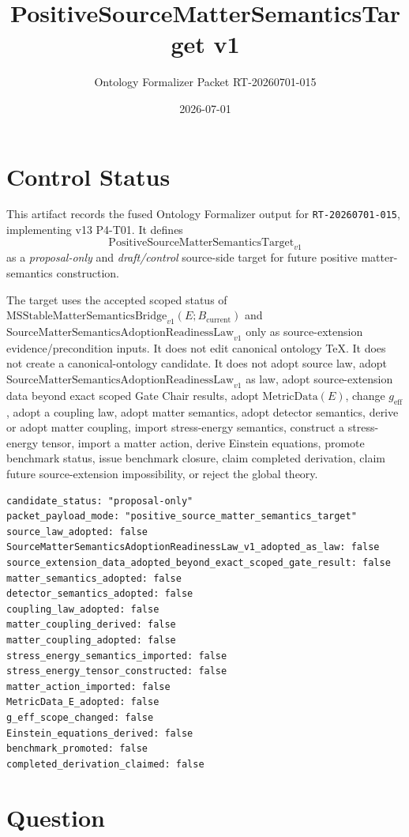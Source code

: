 \documentclass[11pt]{article}
\title{PositiveSourceMatterSemanticsTarget v1}
\author{Ontology Formalizer Packet RT-20260701-015}
\date{2026-07-01}
\newcommand{\Bcur}{B_{\mathrm{current}}}
\newcommand{\MSBridge}{\mathrm{MSStableMatterSemanticsBridge}_{v1}}
\newcommand{\SMSAR}{\mathrm{SourceMatterSemanticsAdoptionReadinessLaw}_{v1}}
\newcommand{\PMSTarget}{\mathrm{PositiveSourceMatterSemanticsTarget}_{v1}}
\newcommand{\MetricData}{\mathrm{MetricData}}
\newcommand{\geff}{g_{\mathrm{eff}}}
\begin{document}
\maketitle

\section{Control Status}

This artifact records the fused Ontology Formalizer output for
\texttt{RT-20260701-015}, implementing v13 P4-T01. It defines
\[
  \PMSTarget
\]
as a \emph{proposal-only} and \emph{draft/control} source-side target for
future positive matter-semantics construction.

The target uses the accepted scoped status of \(\MSBridge(E;\Bcur)\) and
\(\SMSAR\) only as source-extension evidence/precondition inputs. It does not
edit canonical ontology TeX. It does not create a canonical-ontology
candidate. It does not adopt source law, adopt \(\SMSAR\) as law, adopt
source-extension data beyond exact scoped Gate Chair results, adopt
\(\MetricData(E)\), change \(\geff\), adopt a coupling law, adopt matter
semantics, adopt detector semantics, derive or adopt matter coupling, import
stress-energy semantics, construct a stress-energy tensor, import a matter
action, derive Einstein equations, promote benchmark status, issue benchmark
closure, claim completed derivation, claim future source-extension
impossibility, or reject the global theory.

\begin{verbatim}
candidate_status: "proposal-only"
packet_payload_mode: "positive_source_matter_semantics_target"
source_law_adopted: false
SourceMatterSemanticsAdoptionReadinessLaw_v1_adopted_as_law: false
source_extension_data_adopted_beyond_exact_scoped_gate_result: false
matter_semantics_adopted: false
detector_semantics_adopted: false
coupling_law_adopted: false
matter_coupling_derived: false
matter_coupling_adopted: false
stress_energy_semantics_imported: false
stress_energy_tensor_constructed: false
matter_action_imported: false
MetricData_E_adopted: false
g_eff_scope_changed: false
Einstein_equations_derived: false
benchmark_promoted: false
completed_derivation_claimed: false
\end{verbatim}

\section{Question}
\end{document}
